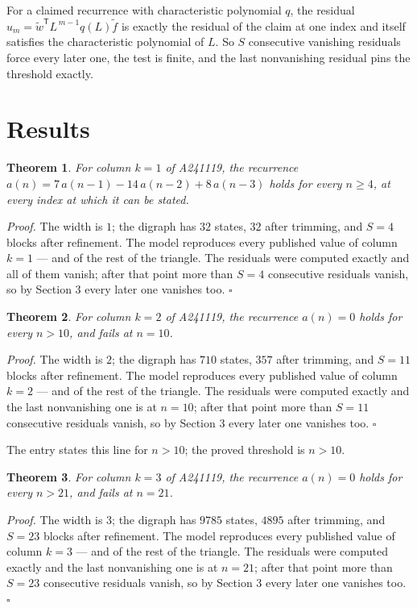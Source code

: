\documentclass[11pt]{article}
\newtheorem{theorem}{Theorem}
\theoremstyle{definition}
\begin{document}
For a claimed recurrence with characteristic polynomial $q$, the residual $u_m = \tilde w^{\mathsf T}L^{\,m-1}q(L)\tilde f$ is exactly the residual of the claim at one index and itself satisfies the characteristic polynomial of $L$. So $S$ consecutive vanishing residuals force every later one, the test is finite, and the last nonvanishing residual pins the threshold exactly.

\section{Results}

\begin{theorem} For column $k = 1$ of A241119, the recurrence $a(n) = 7\,a(n-1) - 14\,a(n-2) + 8\,a(n-3)$ holds for every $n \ge 4$, at every index at which it can be stated.\end{theorem}

{\itshape Proof.} The width is $1$; the digraph has $32$ states, $32$ after trimming, and $S = 4$ blocks after refinement. The model reproduces every published value of column $k = 1$ --- and of the rest of the triangle. The residuals were computed exactly and all of them vanish; after that point more than $S = 4$ consecutive residuals vanish, so by Section 3 every later one vanishes too. $\square$

\begin{theorem} For column $k = 2$ of A241119, the recurrence $a(n) = 0$ holds for every $n > 10$, and fails at $n = 10$.\end{theorem}

{\itshape Proof.} The width is $2$; the digraph has $710$ states, $357$ after trimming, and $S = 11$ blocks after refinement. The model reproduces every published value of column $k = 2$ --- and of the rest of the triangle. The residuals were computed exactly and the last nonvanishing one is at $n = 10$; after that point more than $S = 11$ consecutive residuals vanish, so by Section 3 every later one vanishes too. $\square$

The entry states this line for $n > 10$; the proved threshold is $n > 10$.

\begin{theorem} For column $k = 3$ of A241119, the recurrence $a(n) = 0$ holds for every $n > 21$, and fails at $n = 21$.\end{theorem}

{\itshape Proof.} The width is $3$; the digraph has $9785$ states, $4895$ after trimming, and $S = 23$ blocks after refinement. The model reproduces every published value of column $k = 3$ --- and of the rest of the triangle. The residuals were computed exactly and the last nonvanishing one is at $n = 21$; after that point more than $S = 23$ consecutive residuals vanish, so by Section 3 every later one vanishes too. $\square$
\end{document}
